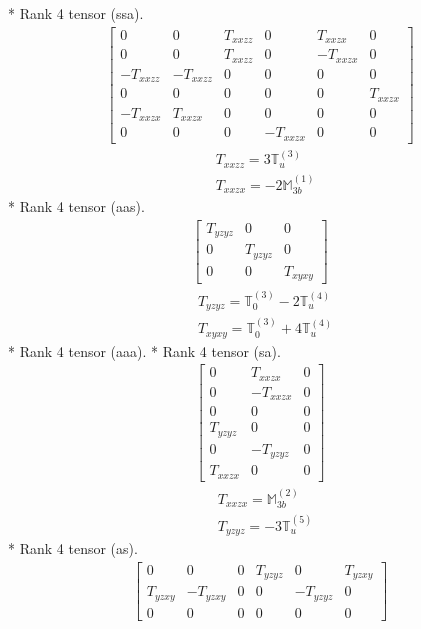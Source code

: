 \documentclass[fleqn,8pt,landscape]{jsarticle}
\begin{document}
* Rank 4 tensor (ssa).
\begin{align*}
\begin{bmatrix} 0 & 0 & T_{xxzz} & 0 & T_{xxzx} & 0 \\ 0 & 0 & T_{xxzz} & 0 & - T_{xxzx} & 0 \\ - T_{xxzz} & - T_{xxzz} & 0 & 0 & 0 & 0 \\ 0 & 0 & 0 & 0 & 0 & T_{xxzx} \\ - T_{xxzx} & T_{xxzx} & 0 & 0 & 0 & 0 \\ 0 & 0 & 0 & - T_{xxzx} & 0 & 0 \end{bmatrix}
\end{align*}
\begin{align*}
& T_{xxzz} = 3 \mathbb{T}_{u}^{(3)} \\
& T_{xxzx} = - 2 \mathbb{M}_{3b}^{(1)}
\end{align*}
* Rank 4 tensor (aas).
\begin{align*}
\begin{bmatrix} T_{yzyz} & 0 & 0 \\ 0 & T_{yzyz} & 0 \\ 0 & 0 & T_{xyxy} \end{bmatrix}
\end{align*}
\begin{align*}
& T_{yzyz} = \mathbb{T}_{0}^{(3)} - 2 \mathbb{T}_{u}^{(4)} \\
& T_{xyxy} = \mathbb{T}_{0}^{(3)} + 4 \mathbb{T}_{u}^{(4)}
\end{align*}
* Rank 4 tensor (aaa).
* Rank 4 tensor (sa).
\begin{align*}
\begin{bmatrix} 0 & T_{xxzx} & 0 \\ 0 & - T_{xxzx} & 0 \\ 0 & 0 & 0 \\ T_{yzyz} & 0 & 0 \\ 0 & - T_{yzyz} & 0 \\ T_{xxzx} & 0 & 0 \end{bmatrix}
\end{align*}
\begin{align*}
& T_{xxzx} = \mathbb{M}_{3b}^{(2)} \\
& T_{yzyz} = - 3 \mathbb{T}_{u}^{(5)}
\end{align*}
* Rank 4 tensor (as).
\begin{align*}
\begin{bmatrix} 0 & 0 & 0 & T_{yzyz} & 0 & T_{yzxy} \\ T_{yzxy} & - T_{yzxy} & 0 & 0 & - T_{yzyz} & 0 \\ 0 & 0 & 0 & 0 & 0 & 0 \end{bmatrix}
\end{align*}
\end{document}
